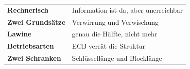 \begin{merksatz}
\begin{center}
\renewcommand{\arraystretch}{1.5}
\begin{tabular}{@{}P{3.0cm}P{5.6cm}@{}}
\toprule
\textbf{Rechnerisch} & Information ist da, aber unerreichbar\\
\textbf{Zwei Grundsätze} & Verwirrung und Verwischung\\
\textbf{Lawine} & genau die Hälfte, nicht mehr\\
\textbf{Betriebsarten} & ECB verrät die Struktur\\
\textbf{Zwei Schranken} & Schlüssellänge und Blocklänge\\
\bottomrule
\end{tabular}
\end{center}

\begin{center}
\begin{minipage}{0.88\textwidth}
\end{minipage}
\end{center}
\end{merksatz}
